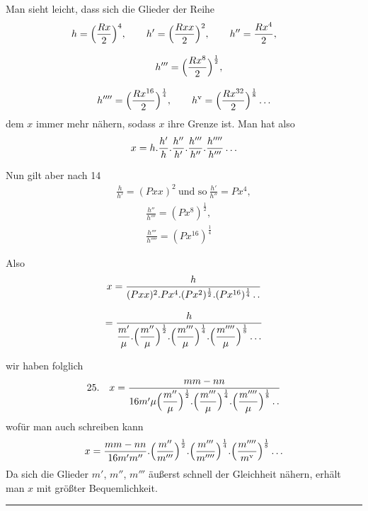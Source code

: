 Man sieht leicht, dass sich die Glieder der Reihe
\[
\begin{gathered}
h=\Bigl(\frac{Rx}{2}\Bigr)^4,\qquad
h'=\Bigl(\frac{Rxx}{2}\Bigr)^2,\qquad
h''=\frac{Rx^4}{2},\qquad
\\[8pt]\quad{}h'''=\Bigl(\frac{Rx^8}{2}\Bigr)^{\frac12},\\[8pt]
h''''=\Bigl(\frac{Rx^{16}}{2}\Bigr)^{\frac14},\qquad
h^{\mathrm{v}}=\Bigl(\frac{Rx^{32}}{2}\Bigr)^{\frac18}\mathinner{.\,.\,.}
\end{gathered}
\]
dem $x$ immer mehr nähern, sodass $x$ ihre Grenze ist. Man hat also
\[
x=h.\frac{h'}{h}.\frac{h''}{h'}.\frac{h'''}{h''}.\frac{h''''}{h'''}\mathinner{.\,.\,.}
\]

Nun gilt aber nach 14
\[
\begin{gathered}\frac{h}{h'}=(Pxx)^2\ \text{und so}\ \frac{h'}{h''}=Px^4,\\[8pt]\quad{}\qquad
\frac{h''}{h'''}=(Px^8)^{\frac12},\\[8pt]\quad{}\qquad
\frac{h'''}{h''''}=(Px^{16})^{\frac14}\end{gathered}
\]

Also
\[
\begin{gathered}
x=\frac{h}{(Pxx)^2.Px^4.(Px^2)^{\frac12}.(Px^{16})^{\frac14}\mathinner{.\,.}}\\[8pt]
=\frac{h}{\dfrac{m'}{\mu}.\Bigl(\dfrac{m''}{\mu}\Bigr)^{\frac12}.\Bigl(\dfrac{m'''}{\mu}\Bigr)^{\frac14}.\Bigl(\dfrac{m''''}{\mu}\Bigr)^{\frac18}\mathinner{.\,.\,.}}
\end{gathered}
\]



wir haben folglich
\[
\begin{gathered}25.\quad x=\frac{mm-nn}{16m'\mu\Bigl(\dfrac{m''}{\mu}\Bigr)^{\frac12}.\Bigl(\dfrac{m'''}{\mu}\Bigr)^{\frac14}.\Bigl(\dfrac{m''''}{\mu}\Bigr)^{\frac18}\mathinner{.\,.}}\end{gathered}
\]
wofür man auch schreiben kann
\[
\begin{gathered}x=\frac{mm-nn}{16m'm''}.\Bigl(\frac{m''}{m'''}\Bigr)^{\frac12}.\Bigl(\frac{m'''}{m''''}\Bigr)^{\frac14}.\Bigl(\frac{m''''}{m^{\mathrm{v}}}\Bigr)^{\frac18}\mathinner{.\,.\,.}\end{gathered}
\]
Da sich die Glieder $m'$, $m''$, $m'''$ äußerst schnell der Gleichheit nähern, erhält man $x$ mit größter Bequemlichkeit.
\begin{center}\rule{0.25\textwidth}{0.3pt}\end{center}





\clearpage
\endgroup
